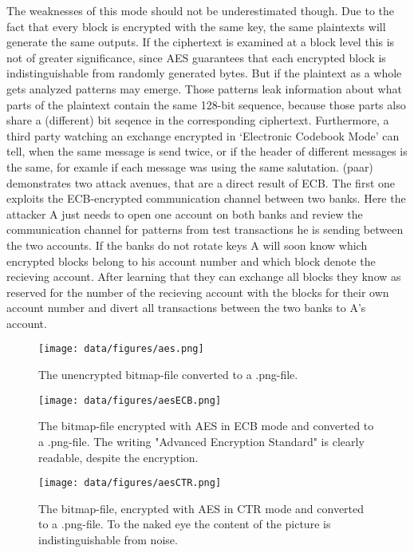 The weaknesses of this mode
should not be underestimated though. Due to the fact that every block is
encrypted with the same key, the same plaintexts will generate the same
outputs. If the ciphertext is examined at a block level this is not of
greater significance, since AES guarantees that each encrypted block is
indistinguishable from randomly generated bytes. But if the plaintext as
a whole gets analyzed patterns may emerge. Those patterns leak
information about what parts of the plaintext contain the same 128-bit
sequence, because those parts also share a (different) bit seqence in
the corresponding ciphertext. Furthermore, a third party watching an
exchange encrypted in `Electronic Codebook Mode' can tell, when the same
message is send twice, or if the header of different messages is the
same, for examle if each message was using the same salutation. (paar)
demonstrates two attack avenues, that are a direct result of ECB. The
first one exploits the ECB-encrypted communication channel between two
banks. Here the attacker A just needs to open one account on both banks
and review the communication channel for patterns from test transactions
he is sending between the two accounts. If the banks do not rotate keys
A will soon know which encrypted blocks belong to his account number and
which block denote the recieving account. After learning that they can
exchange all blocks they know as reserved for the number of the
recieving account with the blocks for their own account number and
divert all transactions between the two banks to A's account.

\begin{figure}
\centering
\texttt{[image: data/figures/aes.png]} 
\caption{The unencrypted bitmap-file converted to a .png-file.}
\end{figure}

\begin{figure}
\centering
\texttt{[image: data/figures/aesECB.png]} 
\caption{The bitmap-file encrypted with AES in ECB mode and converted to a .png-file. The writing "Advanced Encryption Standard" is clearly readable, despite the encryption.}
\end{figure}

\begin{figure}
\centering
\texttt{[image: data/figures/aesCTR.png]} 
\caption{The bitmap-file, encrypted with AES in CTR mode and converted to a .png-file. To the naked eye the content of the picture is indistinguishable from noise.}
\end{figure}

